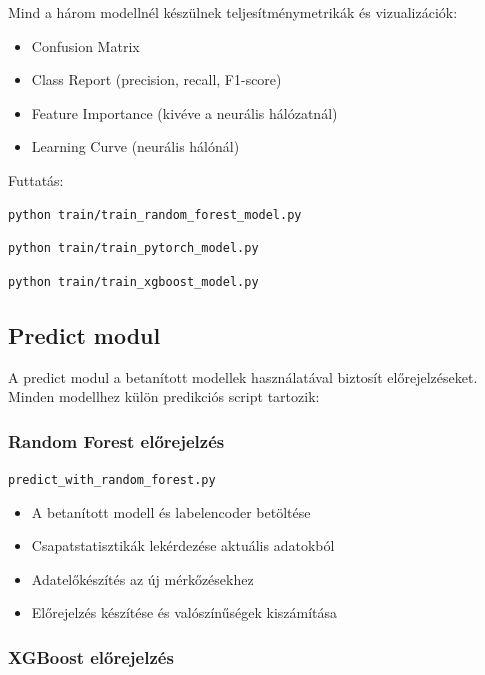 Mind a három modellnél készülnek teljesítménymetrikák és vizualizációk:
\begin{itemize}
    \item Confusion Matrix
    \item Class Report (precision, recall, F1-score)
    \item Feature Importance (kivéve a neurális hálózatnál)
    \item Learning Curve (neurális hálónál)
\end{itemize}

Futtatás:
\begin{lstlisting}[language=bash]
    python train/train_random_forest_model.py
\end{lstlisting}
\begin{lstlisting}[language=bash]
    python train/train_pytorch_model.py
\end{lstlisting}
\begin{lstlisting}[language=bash]
    python train/train_xgboost_model.py
\end{lstlisting}


\subsection{Predict modul}

A predict modul a betanított modellek használatával biztosít előrejelzéseket. Minden modellhez külön predikciós script tartozik:

\subsubsection{Random Forest előrejelzés}

\texttt{predict\_with\_random\_forest.py}

\begin{itemize}
    \item A betanított modell és labelencoder betöltése
    \item Csapatstatisztikák lekérdezése aktuális adatokból
    \item Adatelőkészítés az új mérkőzésekhez
    \item Előrejelzés készítése és valószínűségek kiszámítása
\end{itemize}

\subsubsection{XGBoost előrejelzés}

